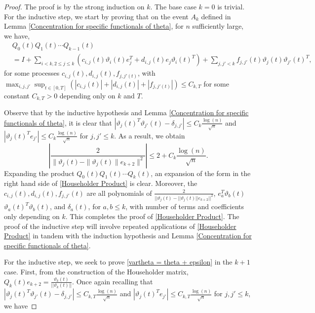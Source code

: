 \documentclass{amsart}
\numberwithin{equation}{section}
\begin{document}
\begin{proof}
The proof is by the strong induction on $k$. The base case $k=0$ is trivial. For the inductive step, we start by proving that on the event $A_k$ defined in Lemma \ref{Concentration for specific functionals of theta}, for $n$ sufficiently large, we have,
\begin{equation}\label{Householder Product}
        \begin{split}
            &Q_0(t)Q_1(t)\cdots Q_{k-1}(t)\\
            &=I +\sum_{i < k, 2\leq j \leq k} \left(c_{i,j}(t) \vartheta_i(t)e_j^T+d_{i,j}(t) e_j\vartheta_i(t)^T\right)+\sum_{j,j' < k} f_{j,j'}(t) \vartheta_j(t)\vartheta_{j'}(t)^T,
        \end{split}
    \end{equation}
for some processes $c_{i,j}(t), d_{i,j}(t), f_{j,j'(t)}$, with $\max_{i,j,j'} \sup_{t \in [0,T]} (|c_{i,j}(t)|+ |d_{i,j}(t)|+|f_{j,j'(t)}|) \leq C_{k,T}$ for some constant $C_{k,T}>0$ depending only on $k$ and $T$. 


Observe that by the inductive hypothesis and Lemma \ref{Concentration for specific functionals of theta}, it is clear that $|\vartheta_j(t)^T \vartheta_{j'}(t)-\delta_{j,j'}| \leq C_k \frac{\log(n)}{\sqrt{n}}$ and $|\vartheta_j(t)^T e_{j'}|\leq C_k \frac{\log(n)}{\sqrt{n}}$ for $j, j' \leq k$. As a result, we obtain
\begin{equation*}
   \left| \frac{2}{\|\vartheta_j(t)-\|\vartheta_j(t)\|e_{k+2}\|^2}\right| \leq 2+C_k\frac{\log(n)}{\sqrt{n}}.
\end{equation*}
Expanding the product $Q_0(t)Q_1(t)\cdots Q_{k}(t)$, an expansion of the form in the right hand side of \eqref{Householder Product} is clear. Moreover, the $c_{i,j}(t),d_{i,j}(t), f_{j,j'}(t)$ are all polynomials of $\frac{2}{||\vartheta_j(t)-||\vartheta_j(t)||e_{k+2}||^2}$, $e_a^T \vartheta_b(t)$ $\vartheta_a(t)^T \vartheta_b(t)$, and $\delta_a(t)$, for $a,b \leq k$, with number of terms and coefficients only depending on $k$. This completes the proof of \eqref{Householder Product}. The proof of the inductive step will involve repeated applications of \eqref{Householder Product} in tandem with the induction hypothesis and Lemma \ref{Concentration for specific functionals of theta}.

For the inductive step, we seek to prove  \eqref{vartheta = theta + epsilon} in the $k+1$ case. First, from the construction of the Householder matrix, $Q_k(t)e_{k+2}=\frac{\vartheta_k(t)}{||\vartheta_k(t)||}$. Once again recalling that $|\vartheta_j(t)^T \vartheta_{j'}(t)-\delta_{j,j'}| \leq C_{k,T} \frac{\log(n)}{\sqrt{n}}$ and $|\vartheta_j(t)^T e_{j'}|\leq C_{k,T} \frac{\log(n)}{\sqrt{n}}$ for $j, j' \leq k$, we have 


\end{proof}
\end{document}
